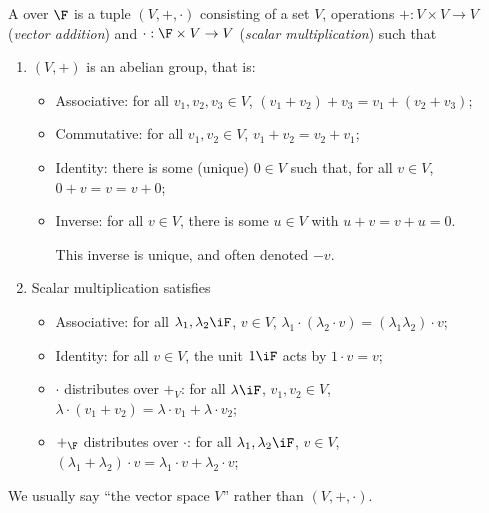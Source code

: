 \begin{definition} %
A  over $\F$ 
is a tuple $(V,+,\cdot)$ 
consisting of a set $V$, operations $+:V\times V\to V$ (\emph{vector addition}) and $\cdot:\F\times V \to V$ (\emph{scalar multiplication}) such that 
	\begin{enumerate}
		\item $(V,+)$ is an abelian group, that is:
		\begin{itemize}
			\shortskip
			\item Associative: for all $v_1,v_2,v_3\in V$, $\left( v_1+v_2 \right)+v_3 = v_1+\left( v_2+v_3 \right)$;
			\item Commutative: for all $v_1,v_2 \in V$, $v_1+v_2 = v_2+v_1$;
			\item Identity: there is some (unique) $0\in V$ such that, for all $v\in V$, $0+v=v=v+0$;
			\item Inverse: for all $v\in V$, there is some $u\in V$ with $u+v=v+u = 0$.
			
			This inverse is unique, and often denoted $-v$.
		\end{itemize}
		
		\item Scalar multiplication satisfies
		\begin{itemize}
			\shortskip
			\item Associative: for all $\lambda_1,\lambda_2\iF$, $v\in V$, $\lambda_1 \cdot \left( \lambda_2 \cdot  v \right) = \left( \lambda_1 \lambda_2 \right) \cdot  v$; %
			\item Identity: for all $v\in V$, the unit $1\iF$ acts by $1\cdot v = v$;
			\item $\cdot$ distributes over $+_V$: for all $\lambda\iF$, $v_1,v_2\in V$, $\lambda\cdot\left( v_1+v_2 \right)= \lambda \cdot v_1 + \lambda \cdot v_2$; %
			\item $+_{\F}$ distributes over $\cdot$:  for all $\lambda_1,\lambda_2\iF$, $v\in V$, $\left( \lambda_1+\lambda_2 \right)\cdot v = \lambda_1\cdot v + \lambda_2\cdot v$; %
		\end{itemize}
	\end{enumerate}
	We usually say ``the vector space $V$'' rather than $(V,+,\cdot)$.
\end{definition}

